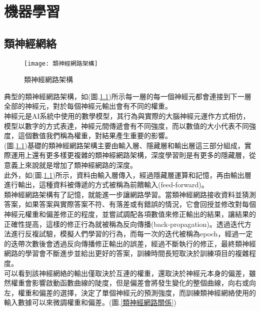 \chapter{機器學習}
\section{類神經網絡}
\begin{figure}[hbt!]
\begin{center}
\texttt{[image: 類神經網路架構]}
\caption{\Large 類神經網路架構}\label{類神經網路架構}
\end{center}
\end{figure}

 典型的類神經網路架構，如(圖.\ref{類神經網路架構})所示每一層的每一個神經元都會連接到下一層全部的神經元，對於每個神經元輸出會有不同的權重。\\

 神經元是AI系統中使用的數學模型，其行為與實際的大腦神經元運作方式相仿，模型以數字的方式表達，神經元間傳遞會有不同強度，而以數值的大小代表不同強度，這個數值我們稱為權重，對結果產生重要的影響。\\

 (圖.\ref{類神經網路架構})基礎的類神經網路架構主要由輸入層、隱藏層和輸出層這三部分組成，實際運用上還有更多樣更複雜的類神經網路架構，深度學習則是有更多的隱藏層，從意義上來說就是增加了類神經網路的深度。\\

 此外，如(圖.\ref{類神經網路架構})所示，資料由輸入層傳入，經過隱藏層運算和記憶，再由輸出層進行輸出，這種資料被傳遞的方式被稱為前饋輸入(feed-forward)。\\

 類神經網路架構有了記憶，就能進一步讓網路學習。當類神經網路接收資料並猜測答案，如果答案與實際答案不符、有落差或有錯誤的情況，它會回授並修改對每個神經元權重和偏差修正的程度，並嘗試調配各項數值來修正輸出的結果，讓結果的正確性提高，這樣的修正行為就被稱為反向傳播(back-propagation)。透過迭代方法進行反複試驗，模擬人們學習的行為，而每一次的迭代被稱為epoch，經過一定的迭帶次數後會透過反向傳播修正輸出的誤差，經過不斷執行的修正，最終類神經網路的學習會不斷進步並給出更好的答案，訓練時間長短取決於訓練項目的複雜程度。\\

 可以看到該神經網絡的輸出僅取決於互連的權重，還取決於神經元本身的偏差，雖然權重會影響啟動函數曲線的陡度，但是偏差會將發生變化的整個曲線，向右或向左，權重和偏差的選擇，決定了單個神經元的預測強度，而訓練類神經網絡使用的輸入數據可以來微調權重和偏差。(圖.\ref{類神經網路關係})\\

